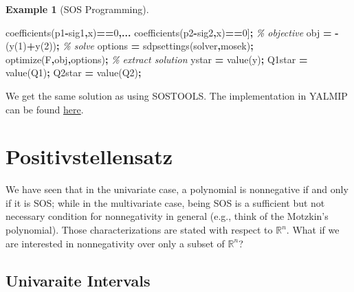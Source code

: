 \documentclass[
]{book}
\newenvironment{Shaded}{\begin{snugshade}}{\end{snugshade}}
\newcommand{\CommentTok}[1]{\textcolor[rgb]{0.56,0.35,0.01}{\textit{#1}}}
\newcommand{\FloatTok}[1]{\textcolor[rgb]{0.00,0.00,0.81}{#1}}
\newcommand{\NormalTok}[1]{#1}
\newcommand{\OperatorTok}[1]{\textcolor[rgb]{0.81,0.36,0.00}{\textbf{#1}}}
\newcommand{\SpecialStringTok}[1]{\textcolor[rgb]{0.31,0.60,0.02}{#1}}
\newcommand{\VariableTok}[1]{\textcolor[rgb]{0.00,0.00,0.00}{#1}}
\theoremstyle{definition}
\theoremstyle{definition}
\newtheorem{example}{Example}[chapter]
\theoremstyle{definition}
\theoremstyle{definition}
\theoremstyle{remark}
\begin{document}
\begin{example}[SOS Programming]
\begin{Shaded}
\begin{Highlighting}[]
    \VariableTok{coefficients}\NormalTok{(}\VariableTok{p1}\OperatorTok{{-}}\VariableTok{sig1}\OperatorTok{,}\VariableTok{x}\NormalTok{)}\OperatorTok{==}\FloatTok{0}\OperatorTok{,...}
    \VariableTok{coefficients}\NormalTok{(}\VariableTok{p2}\OperatorTok{{-}}\VariableTok{sig2}\OperatorTok{,}\VariableTok{x}\NormalTok{)}\OperatorTok{==}\FloatTok{0}\NormalTok{]}\OperatorTok{;}
\CommentTok{\% objective}
\VariableTok{obj} \OperatorTok{=} \OperatorTok{{-}}\NormalTok{(}\VariableTok{y}\NormalTok{(}\FloatTok{1}\NormalTok{)}\OperatorTok{+}\VariableTok{y}\NormalTok{(}\FloatTok{2}\NormalTok{))}\OperatorTok{;}
\CommentTok{\% solve}
\VariableTok{options} \OperatorTok{=} \VariableTok{sdpsettings}\NormalTok{(}\SpecialStringTok{\textquotesingle{}solver\textquotesingle{}}\OperatorTok{,}\SpecialStringTok{\textquotesingle{}mosek\textquotesingle{}}\NormalTok{)}\OperatorTok{;}
\VariableTok{optimize}\NormalTok{(}\VariableTok{F}\OperatorTok{,}\VariableTok{obj}\OperatorTok{,}\VariableTok{options}\NormalTok{)}\OperatorTok{;}
\CommentTok{\% extract solution}
\VariableTok{ystar} \OperatorTok{=} \VariableTok{value}\NormalTok{(}\VariableTok{y}\NormalTok{)}\OperatorTok{;}
\VariableTok{Q1star} \OperatorTok{=} \VariableTok{value}\NormalTok{(}\VariableTok{Q1}\NormalTok{)}\OperatorTok{;}
\VariableTok{Q2star} \OperatorTok{=} \VariableTok{value}\NormalTok{(}\VariableTok{Q2}\NormalTok{)}\OperatorTok{;}
\end{Highlighting}
\end{Shaded}

We get the same solution as using SOSTOOLS. The implementation in YALMIP can be found \href{https://github.com/ComputationalRobotics/Semidefinite-Examples/blob/main/sos_program_example_yalmip.m}{here}.
\end{example}

\section{Positivstellensatz}\label{positivstellensatz}

We have seen that in the univariate case, a polynomial is nonnegative if and only if it is SOS; while in the multivariate case, being SOS is a sufficient but not necessary condition for nonnegativity in general (e.g., think of the Motzkin's polynomial). Those characterizations are stated with respect to \(\mathbb{R}^{n}\). What if we are interested in nonnegativity over only a subset of \(\mathbb{R}^{n}\)?

\subsection{Univaraite Intervals}\label{univaraite-intervals}
\end{document}
